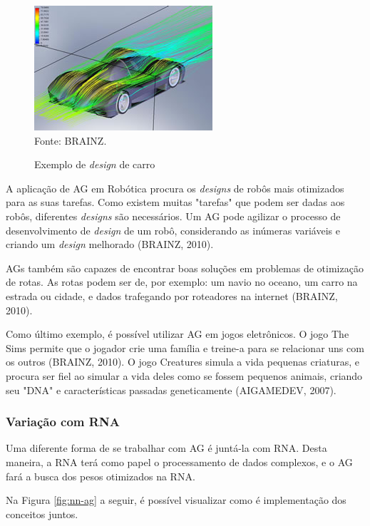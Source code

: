 \documentclass[12pt,a4paper]{article}
\newcommand{\source}[1]{\small Fonte: {#1}}
\begin{document}
	\begin{figure}[ht!]
		\centering
		\caption{Exemplo de \textit{design} de carro}
		\includegraphics[scale=0.7]{AutomotiveDesign.jpg}\\
		\vspace{0.5mm}
		\source{BRAINZ.}
		\label{fig:automotiveDesign}
	\end{figure}
	
	A aplicação de AG em Robótica procura os \textit{designs} de robôs mais otimizados para as suas tarefas.
	Como existem muitas "tarefas"{} que podem ser dadas aos robôs,
	diferentes \textit{designs} são necessários.
	Um AG pode agilizar o processo de desenvolvimento de \textit{design} de um robô,
	considerando as inúmeras variáveis e criando um \textit{design} melhorado
	(BRAINZ, 2010).
	
	AGs também são capazes de encontrar boas soluções em problemas de otimização de rotas.
	As rotas podem ser de, por exemplo:
	um navio no oceano,
	um carro na estrada ou cidade,
	e dados trafegando por roteadores na internet
	(BRAINZ, 2010).
	
	Como último exemplo,
	é possível utilizar AG em jogos eletrônicos.
	O jogo The Sims permite que o jogador crie uma família e treine-a para se relacionar uns com os outros
	(BRAINZ, 2010).
	O jogo Creatures simula a vida pequenas criaturas,
	e procura ser fiel ao simular a vida deles como se fossem pequenos animais,
	criando seu "DNA"{} e características passadas geneticamente
	(AIGAMEDEV, 2007).
	
	\FloatBarrier
	\subsubsection{Variação com RNA}
	Uma diferente forma de se trabalhar com AG é juntá-la com RNA.
	Desta maneira, a RNA terá como papel o processamento de dados complexos,
	e o AG fará a busca dos pesos otimizados na RNA.
	
	Na Figura \ref{fig:nn-ag} a seguir, é possível visualizar como é implementação dos conceitos juntos.
	
\end{document}
